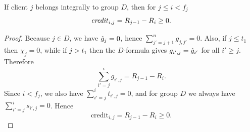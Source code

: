 \begin{lemma}
    \label{lem:credit-D-before}
    If client $j$ belongs integrally to group $D$, then for $j \leq i < f_j$
    \begin{equation*}
        \text{\emph{credit}}_{i,j} = R_{j-1}-R_i \ge 0.
    \end{equation*}
\end{lemma}
\begin{proof}
    Because $j \in D$, we have $\hat{g}_j=0$, hence $\sum_{j'=j+1}^n g_{j,j'}=0$.
    Also, if $j \le t_1$ then $\chi_j=0$, while if $j>t_1$ then the $D$-formula gives $g_{i',j}=\hat{g}_{i'}$ for all $i' \ge j$.
    Therefore
    \begin{equation*}
        \sum_{i'=j}^{i} g_{i',j} = R_{j-1}-R_i.
    \end{equation*}
    Since $i<f_j$, we also have $\sum_{i'=j}^{i} t_{i',j}=0$, and for group $D$ we always have $\sum_{i'=j}^{i} s_{i',j}=0$.
    Hence
    \begin{equation*}
        \text{credit}_{i,j} = R_{j-1}-R_i \ge 0.
    \end{equation*}
\end{proof}

